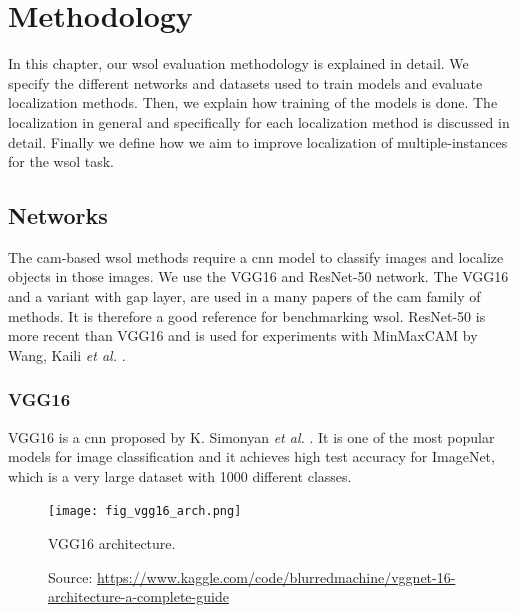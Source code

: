 \chapter{Methodology} \label{ch:methodology}

In this chapter, our \acrshort{wsol} evaluation methodology is explained in detail. We specify the different networks and datasets used to train models and evaluate localization methods. Then, we explain how training of the models is done. The localization in general and specifically for each localization method is discussed in detail. Finally we define how we aim to improve localization of multiple-instances for the \acrshort{wsol} task.

\section{Networks}
The \acrshort{cam}-based \acrshort{wsol} methods require a \acrshort{cnn} model to classify images and localize objects in those images. We use the VGG16 and ResNet-50 network. The VGG16 and a variant with \acrshort{gap} layer, are used in a many papers \cite{zhou2016cvpr, selvaraju2017grad, chattopadhyay2017grad, wang2020score, wang2021minmaxcam} of the \acrshort{cam} family of methods. It is therefore a good reference for benchmarking \acrshort{wsol}. ResNet-50 is more recent than VGG16 and is used for experiments with MinMaxCAM by Wang, Kaili \textit{et al.} \cite{wang2021minmaxcam}.

\subsection{VGG16}
VGG16 is a \acrshort{cnn} proposed by K. Simonyan \textit{et al.} \cite{simonyan2014very}. It is one of the most popular models for image classification and it achieves high test accuracy for ImageNet, which is a very large dataset with 1000 different classes.
\begin{figure}[ht]
    \begin{center}       
    \texttt{[image: fig\_vgg16\_arch.png]}
    \caption[VGG16 architecture]{VGG16 architecture.}
    \caption*{Source: \href{https://www.kaggle.com/code/blurredmachine/vggnet-16-architecture-a-complete-guide}{https://www.kaggle.com/code/blurredmachine/vggnet-16-architecture-a-complete-guide}}
    \label{fig:vgg16_arch}
    \end{center}
\end{figure}

